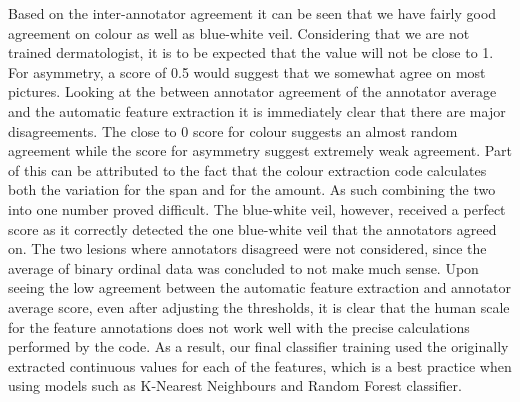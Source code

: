\noindent Based on the inter-annotator agreement it can be seen that we have fairly good agreement on colour as well as blue-white veil. Considering that we are not trained dermatologist, it is to be expected that the value will not be close to 1. For asymmetry, a score of 0.5 would suggest that we somewhat agree on most pictures.
\newline
Looking at the between annotator agreement of the annotator average and the automatic feature extraction it is immediately clear that there are major disagreements. The close to 0 score for colour suggests an almost random agreement while the score for asymmetry suggest extremely weak agreement. Part of this can be attributed to the fact that the colour extraction code calculates both the variation for the span and for the amount. As such combining the two into one number proved difficult. The blue-white veil, however, received a perfect score as it correctly detected the one blue-white veil that the annotators agreed on. The two lesions where annotators disagreed were not considered, since the average of binary ordinal data was concluded to not make much sense. 
\newline
Upon seeing the low agreement between the automatic feature extraction and annotator average score, even after adjusting the thresholds, it is clear that the human scale for the feature annotations does not work well with the precise calculations performed by the code. As a result, our final classifier training used the originally extracted continuous values for each of the features, which is a best practice when using models such as K-Nearest Neighbours and Random Forest classifier.